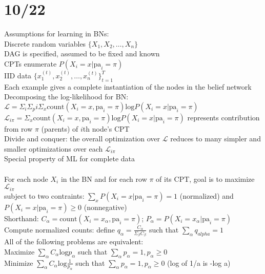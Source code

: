 \documentclass[10pt,letterpaper,unboxed,cm]{article}
\begin{document}
\section{10/22}
Assumptions for learning in BNs:\\
Discrete random variables $\{X_1, X_2, \ldots, X_n\}$\\
DAG is specified, assumed to be fixed and known\\
CPTs enumerate $P(X_i = x|\text{pa}_i = \pi)$\\
IID data $\{x_1^{(t)}, x_2^{(t)}, \ldots, x_n^{(t)}\}^T_{t=1}$\\
Each example gives a complete instantiation of the nodes in the belief network\\
Decomposing the log-likelihood for BN: \\
$\mathcal{L} = \Sigma_i \Sigma_pi \Sigma_x \text{count}(X_i = x, \text{pa}_i = \pi) \text{log} P(X_i = x|\text{pa}_i = \pi)$\\
$\mathcal{L}_{i\pi} = \Sigma_x \text{count}(X_i = x, \text{pa}_i = \pi) \text{log} P(X_i = x|\text{pa}_i = \pi)$ represents contribution from row $\pi$ (parents) of $i$th node's CPT\\
Divide and conquer: the overall optimization over $\mathcal{L}$ reduces to many simpler and smaller optimizations over each $\mathcal{L}_{i\pi}$\\
Special property of ML for complete data\\\\
For each node $X_i$ in the BN and for each row $\pi$ of its CPT, goal is to maximize $\mathcal{L}_{i\pi}$\\
subject to two contraints: $\sum_x P(X_i = x|\text{pa}_i = \pi) = 1$ (normalized) and $P(X_i = x|\text{pa}_i = \pi) \geq 0$ (nonnegative)\\
Shorthand: $C_{\alpha} = \text{count}(X_i = x_{\alpha}, \text{pa}_i = \pi)$; $P_{\alpha} = P(X_i = x_{\alpha}|\text{pa}_i = \pi)$\\
Compute normalized counts: define $q_{\alpha} = \frac{C_{\alpha}}{\Sigma_{\beta} C_{\beta}}$ such that $\sum_{\alpha}q_{alpha} = 1$\\
All of the following problems are equivalent: \\
Maximize $\sum_{\alpha}C_{\alpha} \text{log}p_{\alpha}$ such that $\sum_{\alpha}p_{\alpha} = 1, p_{\alpha} \geq 0$\\
Minimize $\sum_{\alpha}C_{\alpha} \text{log}\frac{1}{p_{\alpha}}$ such that $\sum_{\alpha}p_{\alpha} = 1, p_{\alpha} \geq 0$ (log of 1/a is -log a)\\
\end{document}
